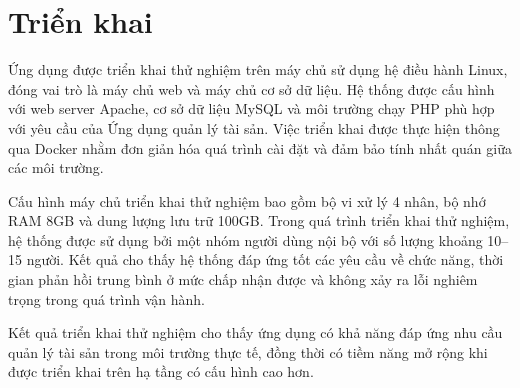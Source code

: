 \documentclass[../DoAn.tex]{subfiles}
\begin{document}
\section{Triển khai}

Ứng dụng được triển khai thử nghiệm trên máy chủ sử dụng hệ điều hành Linux, đóng vai trò là máy chủ web và máy chủ cơ sở dữ liệu. Hệ thống được cấu hình với web server Apache, cơ sở dữ liệu MySQL và môi trường chạy PHP phù hợp với yêu cầu của Ứng dụng quản lý tài sản. Việc triển khai được thực hiện thông qua Docker nhằm đơn giản hóa quá trình cài đặt và đảm bảo tính nhất quán giữa các môi trường.

Cấu hình máy chủ triển khai thử nghiệm bao gồm bộ vi xử lý 4 nhân, bộ nhớ RAM 8GB và dung lượng lưu trữ 100GB. Trong quá trình triển khai thử nghiệm, hệ thống được sử dụng bởi một nhóm người dùng nội bộ với số lượng khoảng 10–15 người. Kết quả cho thấy hệ thống đáp ứng tốt các yêu cầu về chức năng, thời gian phản hồi trung bình ở mức chấp nhận được và không xảy ra lỗi nghiêm trọng trong quá trình vận hành.

Kết quả triển khai thử nghiệm cho thấy ứng dụng có khả năng đáp ứng nhu cầu quản lý tài sản trong môi trường thực tế, đồng thời có tiềm năng mở rộng khi được triển khai trên hạ tầng có cấu hình cao hơn.
\end{document}
